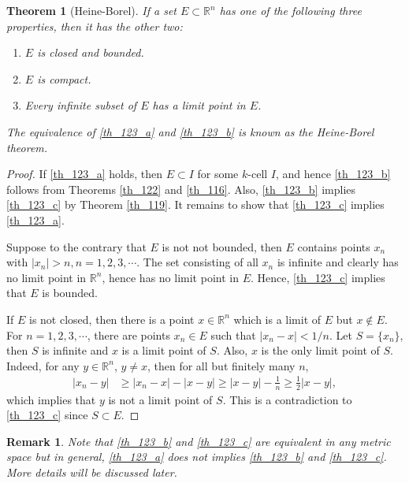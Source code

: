 \documentclass[11pt]{book}
\newtheorem{theorem}{Theorem}[chapter]
\newtheorem{remark}{Remark}[chapter]
\theoremstyle{definition}
\numberwithin{equation}{chapter}
\begin{document}
\medskip

\begin{theorem}[Heine-Borel]\label{th_123}
If a set $E \subset \mathbb{R}^n$ has one of the following three properties, then it has the other two:
\begin{enumerate}[label=(\alph*)]
    \item $E$ is closed and bounded. \label{th_123_a}
    
    \item $E$ is compact. \label{th_123_b}
    
    \item Every infinite subset of $E$ has a limit point in $E$. \label{th_123_c}
\end{enumerate}
The equivalence of \ref{th_123_a} and \ref{th_123_b} is known as the Heine-Borel theorem.
\end{theorem}
\begin{proof}
If \ref{th_123_a} holds, then $E \subset I$ for some $k$-cell $I$, and hence \ref{th_123_b} follows from Theorems \ref{th_122} and \ref{th_116}. Also, \ref{th_123_b} implies \ref{th_123_c} by Theorem \ref{th_119}. It remains to show that \ref{th_123_c} implies \ref{th_123_a}.

Suppose to the contrary that $E$ is not not bounded, then $E$ contains points $x_n$ with $\left|x_n\right| > n, n = 1,2,3,\cdots$. The set consisting of all $x_n$ is infinite and clearly has no limit point in $\mathbb{R}^n$, hence has no limit point in $E$. Hence, \ref{th_123_c} implies that $E$ is bounded.

If $E$ is not closed, then there is a point $x \in \mathbb{R}^n$ which is a limit of $E$ but $x \notin E$. For $n = 1,2,3,\cdots$, there are points $x_n \in E$ such that $\left|x_n - x\right| < 1/n$. Let $S = \{x_n\}$, then $S$ is infinite and $x$ is a limit point of $S$. Also, $x$ is the only limit point of $S$. Indeed, for any $y \in \mathbb{R}^n$, $y \neq x$, then for all but finitely many $n$,
\begin{align*}
    \left|x_n - y\right| & \geq \left|x_n - x\right| - \left|x - y\right| \geq \left|x - y\right| - \frac{1}{n} \geq \frac{1}{2} \left|x - y\right|,
\end{align*}
which implies that $y$ is not a limit point of $S$. This is a contradiction to \ref{th_123_c} since $S \subset E$.
\end{proof}

\begin{remark}
Note that \ref{th_123_b} and \ref{th_123_c} are equivalent in any metric space but in general, \ref{th_123_a} does not implies \ref{th_123_b} and \ref{th_123_c}. More details will be discussed later.
\end{remark}
\end{document}
